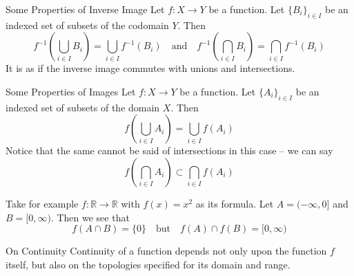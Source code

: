 \begin{remarkBox}{Some Properties of Inverse Image}
    Let \( f: X \rightarrow Y \) be a function. 
    Let \( \{ B_{ i } \}_{ i \in I } \) be an indexed set of subsets of the 
    codomain \( Y \).
    Then 
    \begin{equation*}
        f^{ -1 }
        \left(
            \bigcup _{ i \in I } B_{ i }
        \right)
        =
        \bigcup _{ i \in I } f^{ -1 } ( B_{ i } )
        \quad \mathrm{and} \quad 
        f^{ -1 }
        \left(
            \bigcap _{ i \in I } B_{ i }
        \right)
        =
        \bigcap _{ i \in I } f^{ -1 } ( B_{ i } )
    \end{equation*}
    It is as if the inverse image commutes with unions and intersections.
\end{remarkBox}

\begin{remarkBox}{Some Properties of Images}
    Let \( f: X \rightarrow Y \) be a function. 
    Let \( \{ A_{ i } \}_{ i \in I } \) be an indexed set of subsets of the 
    domain \( X \).
    Then 
    \begin{equation*}
        f
        \left(
            \bigcup_{ i \in I } A_{ i }
        \right)
        =
        \bigcup_{ i \in I } f ( A_{ i } )
    \end{equation*}
    Notice that the same cannot be said of intersections in this case -- 
    we can say 
    \begin{equation*}
        f
        \left(
            \bigcap_{ i \in I } A_{ i }
        \right)
        \subset
        \bigcap_{ i \in I } f ( A_{ i } )
    \end{equation*}

    \baseSkip

    Take for example \( f: \mathbb{R} \rightarrow \mathbb{R} \) with
    \( f ( x ) = x^{ 2 } \) as its formula. 
    Let \( A = ( - \infty, 0 ] \) and \( B = [ 0, \infty ) \).
    Then we see that 
    \begin{equation*}
        f ( A \cap B )
        =
        \{ 0 \}
        \quad \mathrm{but} \quad
        f ( A ) \cap f ( B ) = [ 0, \infty )
    \end{equation*}
\end{remarkBox}

\begin{remarkBox}{On Continuity}
    Continuity of a function depends not only upon the function \( f \) itself,
    but also on the topologies specified for its domain and range.
\end{remarkBox}

